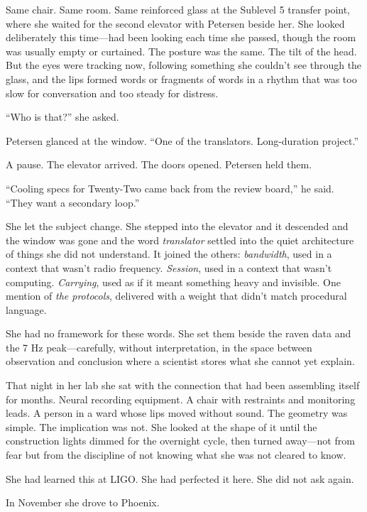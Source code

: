 Same chair. Same room. Same reinforced glass at the Sublevel 5 transfer point, where she waited for the second elevator with Petersen beside her. She looked deliberately this time---had been looking each time she passed, though the room was usually empty or curtained. The posture was the same. The tilt of the head. But the eyes were tracking now, following something she couldn't see through the glass, and the lips formed words or fragments of words in a rhythm that was too slow for conversation and too steady for distress.

``Who is that?'' she asked.

Petersen glanced at the window. ``One of the translators. Long-duration project.''

A pause. The elevator arrived. The doors opened. Petersen held them.

``Cooling specs for Twenty-Two came back from the review board,'' he said. ``They want a secondary loop.''

She let the subject change. She stepped into the elevator and it descended and the window was gone and the word \textit{translator} settled into the quiet architecture of things she did not understand. It joined the others: \textit{bandwidth}, used in a context that wasn't radio frequency. \textit{Session}, used in a context that wasn't computing. \textit{Carrying}, used as if it meant something heavy and invisible. One mention of \textit{the protocols}, delivered with a weight that didn't match procedural language.

She had no framework for these words. She set them beside the raven data and the 7 Hz peak---carefully, without interpretation, in the space between observation and conclusion where a scientist stores what she cannot yet explain.

That night in her lab she sat with the connection that had been assembling itself for months. Neural recording equipment. A chair with restraints and monitoring leads. A person in a ward whose lips moved without sound. The geometry was simple. The implication was not. She looked at the shape of it until the construction lights dimmed for the overnight cycle, then turned away---not from fear but from the discipline of not knowing what she was not cleared to know.

She had learned this at LIGO. She had perfected it here. She did not ask again.

\scenebreak

In November she drove to Phoenix.

